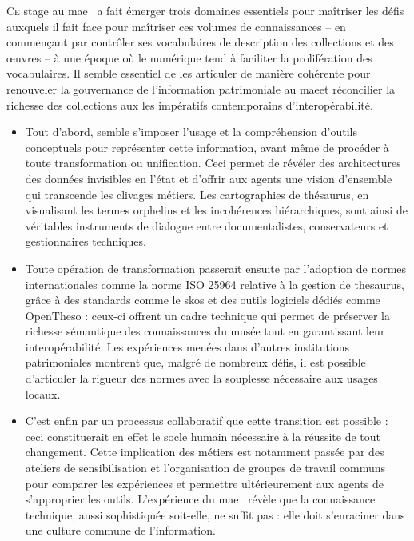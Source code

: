 \documentclass[12pt,twoside]{book}
\newcommand{\mae}{\ac{mae}}
\newcommand{\maelong}{\acf{mae}}
\begin{document}
	\lettrine{C}{e} stage au \maelong~ a fait émerger trois domaines essentiels pour maîtriser les défis auxquels il fait face pour maîtriser ces volumes de connaissances -- en commençant par contrôler ses vocabulaires de description des collections et des œuvres -- à une époque où le numérique tend à faciliter la prolifération des vocabulaires. Il semble essentiel de les articuler de manière cohérente pour renouveler la gouvernance de l'information patrimoniale au \mae et réconcilier la richesse des collections aux les impératifs contemporains d'interopérabilité.
	
	\begin{itemize} 
		
		\item Tout d'abord, semble s'imposer l'usage et la compréhension d'outils conceptuels pour représenter cette information, avant même de procéder à toute transformation ou unification. Ceci permet de révéler des architectures des données invisibles en l'état et d'offrir aux agents une vision d'ensemble qui transcende les clivages métiers. Les cartographies de thésaurus, en visualisant les termes orphelins et les incohérences hiérarchiques, sont ainsi de véritables instruments de dialogue entre documentalistes, conservateurs et gestionnaires techniques.
		
		
		\item Toute opération de transformation passerait ensuite par l'adoption de normes internationales comme la norme ISO 25964 relative à la gestion de \gls{thesaurus}, grâce à des standards comme le \gls{skos} et des outils logiciels dédiés comme OpenTheso : ceux-ci offrent un cadre technique qui permet de préserver la richesse sémantique des connaissances du musée tout en garantissant leur interopérabilité. Les expériences menées dans d'autres institutions patrimoniales montrent que, malgré de nombreux défis, il est possible d'articuler la rigueur des normes avec la souplesse nécessaire aux usages locaux.
		
		
		\item C'est enfin par un processus collaboratif que cette transition est possible : ceci constituerait en effet le socle humain nécessaire à la réussite de tout changement. Cette implication des métiers est notamment passée par des ateliers de sensibilisation et l'organisation de groupes de travail communs pour comparer les expériences et permettre ultérieurement aux agents de s'approprier les outils. L'expérience du \mae~ révèle que la connaissance technique, aussi sophistiquée soit-elle, ne suffit pas : elle doit s'enraciner dans une culture commune de l'information.
		
	\end{itemize}
	
\end{document}
